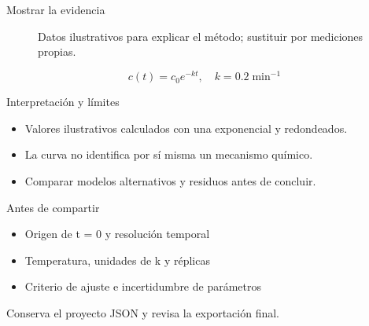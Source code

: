 \documentclass[aspectratio=169,11pt]{beamer}
\begin{document}
\begin{frame}{Mostrar la evidencia}
  \transdissolve[duration=0.25]
  \begin{figure}
    \centering
    \caption{Datos ilustrativos para explicar el método; sustituir por mediciones propias.}
  \end{figure}
  \medskip

  \begin{equation*}
    c(t)=c_0 e^{-kt},\quad k=0.2\;\mathrm{min}^{-1}
  \end{equation*}
\end{frame}

\begin{frame}{Interpretación y límites}
  \transdissolve[duration=0.25]
  \begin{itemize}
    \item Valores ilustrativos calculados con una exponencial y redondeados.
    \item La curva no identifica por sí misma un mecanismo químico.
    \item Comparar modelos alternativos y residuos antes de concluir.
  \end{itemize}
\end{frame}

\begin{frame}{Antes de compartir}
  \transdissolve[duration=0.25]
  \begin{itemize}
    \item Origen de t = 0 y resolución temporal
    \item Temperatura, unidades de k y réplicas
    \item Criterio de ajuste e incertidumbre de parámetros
  \end{itemize}
  \medskip

  {\small Conserva el proyecto JSON y revisa la exportación final.}
\end{frame}
\end{document}
